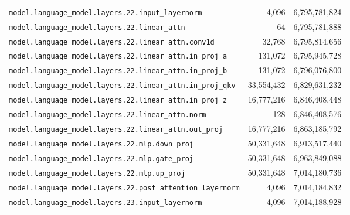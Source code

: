 \documentclass[10pt,a4paper]{article}
\theoremstyle{definition}
\begin{document}
\begin{appendices}
\begin{longtable}{p{9.5cm}rr}
\texttt{model.\allowbreak{}language\_model.\allowbreak{}layers.\allowbreak{}22.\allowbreak{}input\_layernorm} & 4,096 & 6,795,781,824 \\
\texttt{model.\allowbreak{}language\_model.\allowbreak{}layers.\allowbreak{}22.\allowbreak{}linear\_attn} & 64 & 6,795,781,888 \\
\texttt{model.\allowbreak{}language\_model.\allowbreak{}layers.\allowbreak{}22.\allowbreak{}linear\_attn.\allowbreak{}conv1d} & 32,768 & 6,795,814,656 \\
\texttt{model.\allowbreak{}language\_model.\allowbreak{}layers.\allowbreak{}22.\allowbreak{}linear\_attn.\allowbreak{}in\_proj\_a} & 131,072 & 6,795,945,728 \\
\texttt{model.\allowbreak{}language\_model.\allowbreak{}layers.\allowbreak{}22.\allowbreak{}linear\_attn.\allowbreak{}in\_proj\_b} & 131,072 & 6,796,076,800 \\
\texttt{model.\allowbreak{}language\_model.\allowbreak{}layers.\allowbreak{}22.\allowbreak{}linear\_attn.\allowbreak{}in\_proj\_qkv} & 33,554,432 & 6,829,631,232 \\
\texttt{model.\allowbreak{}language\_model.\allowbreak{}layers.\allowbreak{}22.\allowbreak{}linear\_attn.\allowbreak{}in\_proj\_z} & 16,777,216 & 6,846,408,448 \\
\texttt{model.\allowbreak{}language\_model.\allowbreak{}layers.\allowbreak{}22.\allowbreak{}linear\_attn.\allowbreak{}norm} & 128 & 6,846,408,576 \\
\texttt{model.\allowbreak{}language\_model.\allowbreak{}layers.\allowbreak{}22.\allowbreak{}linear\_attn.\allowbreak{}out\_proj} & 16,777,216 & 6,863,185,792 \\
\texttt{model.\allowbreak{}language\_model.\allowbreak{}layers.\allowbreak{}22.\allowbreak{}mlp.\allowbreak{}down\_proj} & 50,331,648 & 6,913,517,440 \\
\texttt{model.\allowbreak{}language\_model.\allowbreak{}layers.\allowbreak{}22.\allowbreak{}mlp.\allowbreak{}gate\_proj} & 50,331,648 & 6,963,849,088 \\
\texttt{model.\allowbreak{}language\_model.\allowbreak{}layers.\allowbreak{}22.\allowbreak{}mlp.\allowbreak{}up\_proj} & 50,331,648 & 7,014,180,736 \\
\texttt{model.\allowbreak{}language\_model.\allowbreak{}layers.\allowbreak{}22.\allowbreak{}post\_attention\_layernorm} & 4,096 & 7,014,184,832 \\
\texttt{model.\allowbreak{}language\_model.\allowbreak{}layers.\allowbreak{}23.\allowbreak{}input\_layernorm} & 4,096 & 7,014,188,928 \\

\end{longtable}
\end{appendices}
\end{document}
